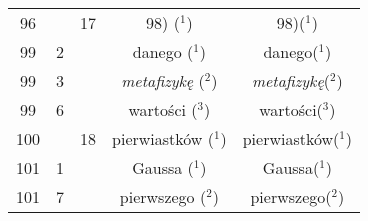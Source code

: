 \documentclass[a4paper,11pt]{article}
\begin{document}
\begin{center}
\begin{tabular}{|c|c|c|c|c|}
    96  & & 17 & 98) ($^{ 1 }$) & 98)($^{ 1 }$) \\
    99  &  2 & & danego ($^{ 1 }$) & danego($^{ 1 }$) \\
    99  &  3 & & \textit{metafizykę} ($^{ 2 }$)
           & \textit{metafizykę}($^{ 2 }$) \\
    99  &  6 & & wartości ($^{ 3 }$) & wartości($^{ 3 }$) \\
    100 & & 18 & pierwiastków ($^{ 1 }$) & pierwiastków($^{ 1 }$) \\
    101 &  1 & & Gaussa ($^{ 1 }$) & Gaussa($^{ 1 }$) \\
    101 &  7 & & pierwszego ($^{ 2 }$) & pierwszego($^{ 2 }$) \\
    \hline
  \end{tabular}





  \newpage


\end{center}
\end{document}
